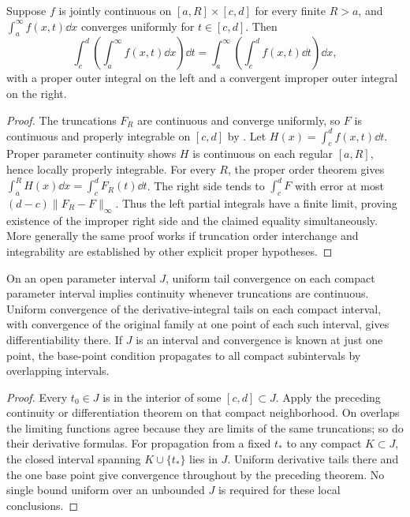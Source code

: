 \begin{theorem}
Suppose $f$ is jointly continuous on $[a,R]\times[c,d]$ for every
finite $R>a$, and $\int_a^\infty f(x,t)\dd x$ converges uniformly
for $t\in[c,d]$. Then
\[\int_c^d\left(\int_a^\infty f(x,t)\dd x\right)\dd t
=\int_a^\infty\left(\int_c^df(x,t)\dd t\right)\dd x,
\]
with a proper outer integral on the left and a convergent improper
outer integral on the right.
\end{theorem}
\begin{proof}
The truncations $F_R$ are continuous and converge uniformly, so $F$ is
continuous and properly integrable on $[c,d]$ by
. Let
$H(x)=\int_c^df(x,t)\dd t$. Proper parameter continuity shows $H$
is continuous on each regular $[a,R]$, hence locally properly integrable.
For every $R$, the proper order theorem gives
$\int_a^RH(x)\dd x=\int_c^dF_R(t)\dd t$.
The right side tends to $\int_c^dF$ with error at most
$(d-c)\|F_R-F\|_\infty$. Thus the left partial integrals have a
finite limit, proving existence of the improper right side and the
claimed equality simultaneously. More generally the same proof works
if truncation order interchange and integrability are established by
other explicit proper hypotheses.
\end{proof}

\begin{proposition}
On an open parameter interval $J$, uniform tail convergence on each
compact parameter interval implies continuity whenever truncations are
continuous. Uniform convergence of the derivative-integral tails on
each compact interval, with convergence of the original family at one
point of each such interval, gives differentiability there. If $J$ is
an interval and convergence is known at just one point, the base-point
condition propagates to all compact subintervals by overlapping intervals.
\end{proposition}
\begin{proof}
Every $t_0\in J$ is in the interior of some $[c,d]\subset J$.
Apply the preceding continuity or differentiation theorem on that
compact neighborhood. On overlaps the limiting functions agree because
they are limits of the same truncations; so do their derivative formulas.
For propagation from a fixed $t_*$ to any compact $K\subset J$, the
closed interval spanning $K\cup\{t_*\}$ lies in $J$. Uniform derivative
tails there and the one base point give convergence throughout by the
preceding theorem. No single bound uniform over an unbounded $J$ is
required for these local conclusions.
\end{proof}

